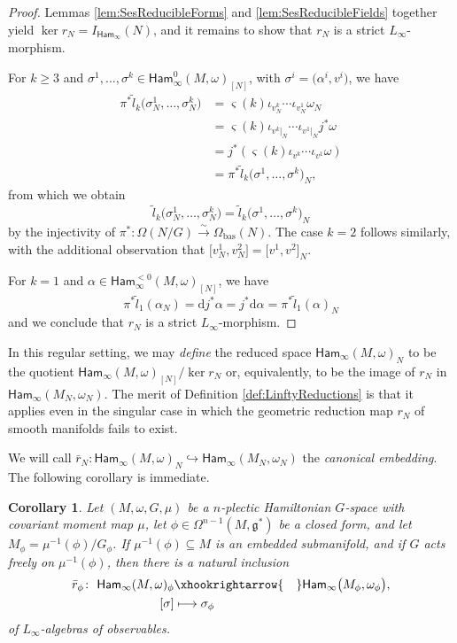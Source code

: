 \documentclass[10pt,a4paper]{amsart}
\numberwithin{equation}{section}
\newtheorem{Corollary}[Theorem]{Corollary}
\newcommand{\g}{\mathfrak{g}}
\newcommand{\Ham}{\mathsf{Ham}}
\renewcommand{\subset}{\subseteq}
\renewcommand{\d}{\mathrm{d}}
\begin{document}
\begin{proof}
	Lemmas \ref{lem:SesReducibleForms} and \ref{lem:SesReducibleFields} together yield $\ker r_N=I_{\Ham_\infty}(N)$, and it remains to show that $r_N$ is a strict $L_\infty$-morphism.

	For $k\geq 3$ and $\sigma^1,\dots,\sigma^k \in \Ham_\infty^0(M,\omega)_{[N]}$, with $\sigma^i=\bigl(\alpha^i,v^i\bigr)$, we have
	\begin{align*}
		\pi^* \tilde{l}_k\bigl(\sigma_N^1,\dots,\sigma_N^k\bigr)
			&=	\varsigma(k)  \iota_{v_N^k}\cdots\iota_{v_N^1} \omega_N		\\
		&=	\varsigma(k)  \iota_{v^k|_N}\cdots\iota_{v^1|_N} j^*\omega		\\
		&=	j^*(\varsigma(k)  \iota_{v^k}\cdots\iota_{v^1}\omega)		\\
		&=	\pi^* \tilde{l}_k\bigl(\sigma^1,\dots,\sigma^k\bigr)_N,
	\end{align*}
	from which we obtain
	\[
		\tilde{l}_k\bigl(\sigma_N^1,\dots,\sigma_N^k\bigr) = \tilde{l}_k\bigl(\sigma^1,\dots,\sigma^k\bigr)_N
	\]
	by the injectivity of $\pi^*\colon \Omega(N/G)\xrightarrow{\sim}\Omega_{\mathrm{bas}}(N)$. The case $k=2$ follows similarly, with the additional observation that $\bigl[v_N^1,v_N^2\bigr] = \bigl[v^1,v^2\bigr]_N$.

	For $k=1$ and $\alpha\in\Ham_\infty^{<0}(M,\omega)_{[N]}$, we have
	\[
		\pi^*\tilde{l}_1(\alpha_N) = \d j^*\alpha = j^*\d\alpha = \pi^*\tilde{l}_1(\alpha)_N
	\]
	and we conclude that $r_N$ is a strict $L_\infty$-morphism.
\end{proof}


\begin{Remark}
	In this regular setting, we may \emph{define} the reduced space $\Ham_\infty(M,\omega)_N$ to be the quotient $\Ham_\infty(M,\omega)_{[N]} / \ker r_N$ or, equivalently, to be the image of $r_N$ in $\Ham_\infty(M_N,\omega_N)$. The merit of Definition \ref{def:LinftyReductions} is that it applies even in the singular case in which the geometric reduction map $r_N$ of smooth manifolds fails to exist.
\end{Remark}

We will call $\bar{r}_N\colon \Ham_\infty(M,\omega)_N \hookrightarrow \Ham_\infty(M_N,\omega_N)$ the \emph{canonical embedding}. The following corollary is immediate.

\begin{Corollary}
	Let $(M,\omega,G,\mu)$ be a $n$-plectic Hamiltonian $G$-space with covariant moment map $\mu$, let $\phi\in\Omega^{n-1}(M,\g^*)$ be a closed form, and let $M_\phi= \mu^{-1}(\phi)/G_\phi$. If $\mu^{-1}(\phi)\subset M$ is an embedded submanifold, and if $G$ acts freely on $\mu^{-1}(\phi)$, then there is a natural inclusion
	\begin{align*}
		\bar{r}_\phi\colon \	\Ham_\infty(M,\omega)_\phi	&\xhookrightarrow{\hspace{10pt}}	\Ham_\infty\bigl(M_\phi,\omega_\phi\bigr),	\\
				[\sigma]		&\longmapsto				\sigma_\phi
	\end{align*}
	of $L_\infty$-algebras of observables.
\end{Corollary}
\end{document}
